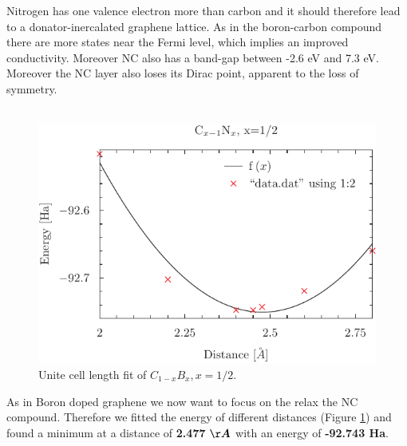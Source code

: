 				Nitrogen has one valence electron more than carbon and it should therefore lead to a donator-inercalated graphene lattice. As in the boron-carbon compound there are more states near the Fermi level, which implies an improved conductivity. Moreover NC also has a band-gap between -2.6 eV and 7.3 eV. Moreover the NC layer also loses its Dirac point, apparent to the loss of symmetry. \\\\
				\begin{figure}
					\includegraphics[width=\textwidth]{Results/Nitrogen/Nitrogen1R/data.pdf}
					\caption{Unite cell length fit of $C_{1-x}B_x,x= 1 / 2$.}
					\label{fig:nitrogenFitting}
				\end{figure}
				As in Boron doped graphene we now want to focus on the relax the NC compound. Therefore we fitted the energy of different distances (Figure \ref{fig:nitrogenFitting}) and found a minimum at a distance of \textbf{2.477} $\boldsymbol{\AA}$ with an energy of \textbf{-92.743 Ha}.
				
